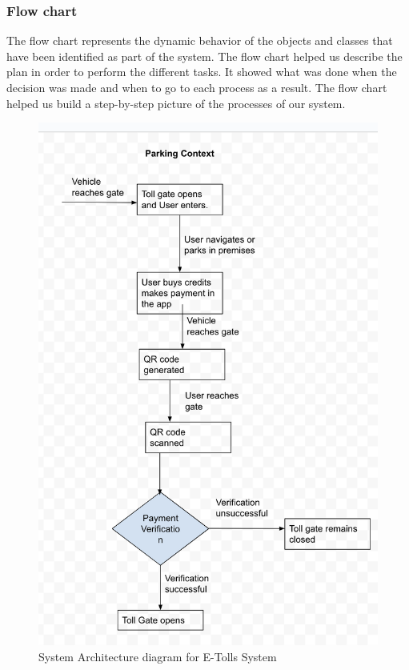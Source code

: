 \subsubsection{Flow chart}
The flow chart represents the dynamic behavior of the objects and classes that have been identified as part of the system. The flow chart helped us describe the plan in order to perform the different tasks. It showed what was done when the decision was made and when to go to each process as a result. The flow chart helped us build a step-by-step picture of the processes of our system.
\begin{figure}[h]
    \begin{center}
        \includegraphics[scale = 0.6]{images/userflowdiagram}
        \caption{System Architecture diagram for E-Tolls System}
    \end{center}
\end{figure}
\clearpage

